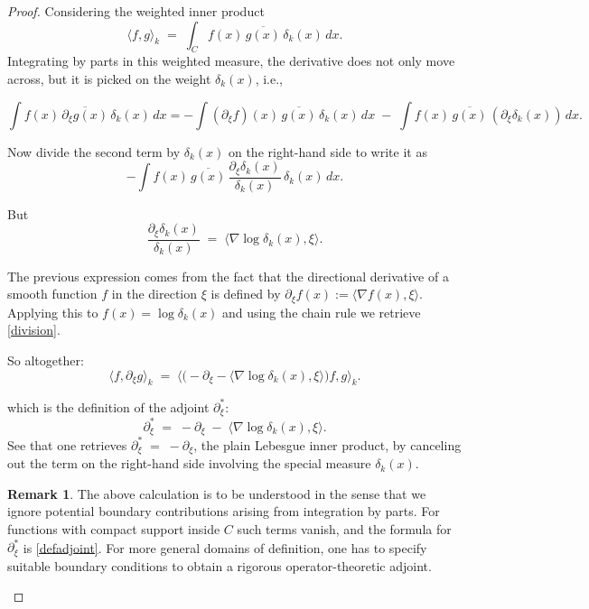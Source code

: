 \documentclass[12pt]{article}
\newcommand{\1}{\mathbbm{1}}
\theoremstyle{definition}
\newtheorem{remark}{Remark}
\begin{document}
\begin{proof}
Considering the weighted inner product
\[
  \langle f,g \rangle_k
  \;=\;
  \int_C f(x)\,\overline{g(x)}\,\delta_k(x)\,dx .
\]
\noindent
Integrating by parts in this weighted measure, the derivative does not only move across, but it is picked on the weight \(\delta_k(x)\), i.e., 

\[
  \int f(x)\,\overline{\partial_\xi g(x)}\,\delta_k(x)\,dx  = -\int (\partial_\xi f)(x)\,\overline{g(x)}\,\delta_k(x)\,dx
    \;-\; \int f(x)\,\overline{g(x)}\,(\partial_\xi \delta_k(x))\,dx .
\]



Now divide the second term by \(\delta_k(x)\) on the right-hand side to write it as
\[
  - \int f(x)\,\overline{g(x)}\,
     \frac{\partial_\xi \delta_k(x)}{\delta_k(x)}\,\delta_k(x)\,dx .
\]

But
\begin{equation}\label{division}
  \frac{\partial_\xi \delta_k(x)}{\delta_k(x)}
  \;=\; \langle \nabla \log \delta_k(x), \xi \rangle.
\end{equation}

The previous expression comes from the fact that the directional derivative of a smooth function $f$ in the direction $\xi$ is defined by $\partial_\xi f(x) := \langle \nabla f(x), \xi \rangle$. Applying this to $f(x) = \log \delta_k(x)$ and using the chain rule  we retrieve \eqref{division}.



So altogether:
\[
  \langle f, \partial_\xi g \rangle_k
  \;=\;
  \langle \big(-\partial_\xi - \langle \nabla \log \delta_k(x), \xi \rangle\big) f , g \rangle_k .
\]

which is the definition of the adjoint \(\partial_\xi^*\):
\begin{equation}\label{defadjoint}
  \partial_\xi^* \;=\; -\partial_\xi \;-\; \langle \nabla \log \delta_k(x), \xi \rangle .
\end{equation}
See that one retrieves $\partial_{\xi}^{*} \;=\; -\partial_{\xi}$, the plain Lebesgue inner product, by canceling out the term on the right-hand side involving the special measure $\delta_k(x).$


\begin{remark}
The above calculation is to be understood in the sense that we ignore potential boundary contributions arising from
integration by parts.  For functions with compact support inside $C$
such terms vanish, and the formula for $\partial_\xi^{*}$ is \eqref{defadjoint}.
For more general domains of definition, one has to specify suitable
boundary conditions to obtain a rigorous operator-theoretic adjoint.
\end{remark}


\end{proof}
\end{document}
